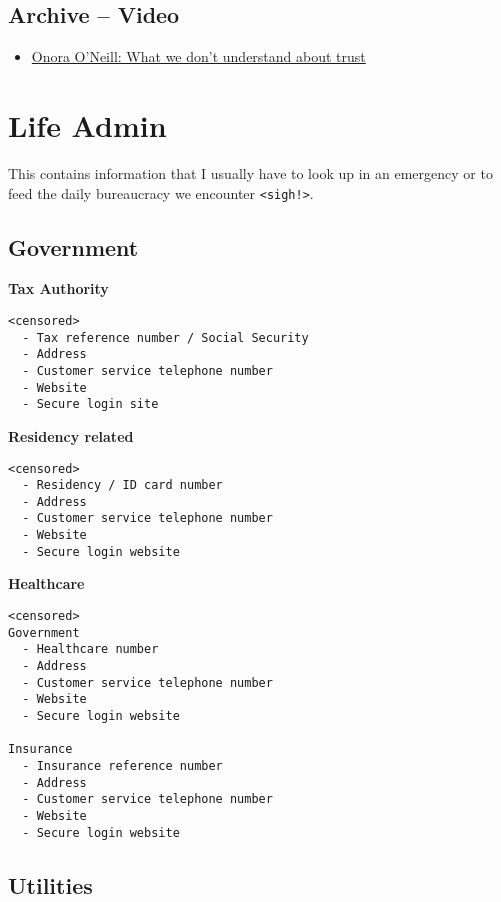 \documentclass[]{book}
\providecommand{\tightlist}{%
  \setlength{\itemsep}{0pt}\setlength{\parskip}{0pt}}
\theoremstyle{definition}
\theoremstyle{definition}
\theoremstyle{definition}
\theoremstyle{remark}
\begin{document}
\section{Archive -- Video}\label{archive-video}

\begin{itemize}
\tightlist
\item
  \href{https://www.ted.com/talks/onora_o_neill_what_we_don_t_understand_about_trust}{Onora
  O'Neill: What we don't understand about trust}
\end{itemize}

\chapter{Life Admin}\label{life-admin}

This contains information that I usually have to look up in an emergency
or to feed the daily bureaucracy we encounter
\texttt{\textless{}sigh!\textgreater{}}.

\section{Government}\label{government}

\textbf{Tax Authority}

\begin{verbatim}
<censored>
  - Tax reference number / Social Security
  - Address
  - Customer service telephone number
  - Website
  - Secure login site
\end{verbatim}

\textbf{Residency related}

\begin{verbatim}
<censored>
  - Residency / ID card number
  - Address
  - Customer service telephone number
  - Website
  - Secure login website
\end{verbatim}

\textbf{Healthcare}

\begin{verbatim}
<censored>
Government
  - Healthcare number
  - Address
  - Customer service telephone number
  - Website
  - Secure login website
  
Insurance
  - Insurance reference number
  - Address
  - Customer service telephone number
  - Website
  - Secure login website
\end{verbatim}

\section{Utilities}\label{utilities}
\end{document}
